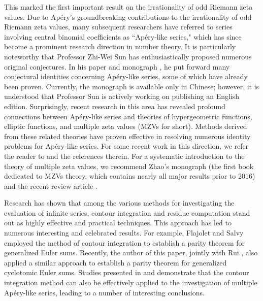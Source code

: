 \documentclass[11pt]{article}
\theoremstyle{plain}
\theoremstyle{definition}
\begin{document}
This marked the first important result on the irrationality of odd Riemann zeta values. Due to Ap\'ery's groundbreaking contributions to the irrationality of odd Riemann zeta values, many subsequent researchers have referred to series involving central binomial coefficients as ``Ap\'ery-like series," which has since become a prominent research direction in number theory. It is particularly noteworthy that Professor Zhi-Wei Sun has enthusiastically proposed numerous original conjectures. In his paper \cite{Sun2015} and monograph \cite{Sun2021}, he put forward many conjectural identities concerning Ap\'ery-like series, some of which have already been proven. Currently, the monograph \cite{Sun2021} is available only in Chinese; however, it is understood that Professor Sun is actively working on publishing an English edition. Surprisingly, recent research in this area has revealed profound connections between Ap\'ery-like series and theories of hypergeometric functions, elliptic functions, and multiple zeta values (MZVs for short). Methods derived from these related theories have proven effective in resolving numerous identity problems for Ap\'ery-like series. For some recent work in this direction, we refer the reader to \cite{Au2024,Au2025,Campbell2019,CampbellCA2022,CantariniD2019,CampbellGZ2024,CampbellDS2019,ChenWangZhong2025,ChenWang2025,GR2025,LaiLuorr2022,Lupu2022,WX2021,WLX2022} and the references therein. For a systematic introduction to the theory of multiple zeta values, we recommend Zhao's monograph \cite{Z2016} (the first book dedicated to MZVs theory, which contains nearly all major results prior to 2016) and the recent review article \cite{Z2024}.

Research has shown that among the various methods for investigating the evaluation of infinite series, contour integration and residue computation stand out as highly effective and practical techniques. This approach has led to numerous interesting and celebrated results. For example, Flajolet and Salvy \cite{Flajolet-Salvy} employed the method of contour integration to establish a parity theorem for generalized Euler sums. Recently, the author of this paper, jointly with Rui \cite{Rui-Xu2025}, also applied a similar approach to establish a parity theorem for generalized cyclotomic Euler sums.  Studies presented in \cite{WX2021} and \cite{WLX2022} demonstrate that the contour integration method can also be effectively applied to the investigation of multiple Ap\'ery-like series, leading to a number of interesting conclusions.
\end{document}
